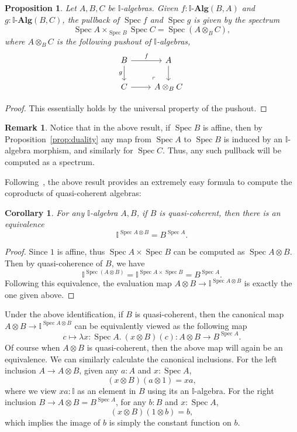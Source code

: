 \documentclass[12pt]{amsart}
\newtheorem{corollary}[theorem]{Corollary}
\newtheorem{proposition}[theorem]{Proposition}
\theoremstyle{definition}
\newtheorem{remark}[theorem]{Remark}
\newcommand{\mb}[1]{\mathbf{#1}}
\newcommand{\mbb}[1]{\mathbb{#1}}
\newcommand{\I}{\mbb I}
\newcommand{\alg}{\text{-}\mb{Alg}}
\newcommand{\ld}[2]{\lambda #1\!\colon\!\!#2.\ }
\newcommand{\spec}{\operatorname{Spec}}
\begin{document}
\begin{proposition}\label{prop:pullbackofaffine}
  Let $A,B,C$ be $\I$-algebras. Given $f : \I\alg(B,A)$ and $g : \I\alg(B,C)$, the pullback of $\spec f$ and $\spec g$ is given by the spectrum
  \[ \spec A \times_{\spec B} \spec C = \spec (A \otimes_B C), \]
  where $A \otimes_B C$ is the following pushout of $\I$-algebras,
  \[
    \begin{tikzcd}
      B \ar[r, "f"] \ar[d, "g"'] & A \ar[d] \\
      C \ar[r] & A \otimes_B C
      \arrow["\lrcorner"{anchor=center, pos=0.125, rotate=180}, draw=none, from=2-2, to=1-1]
    \end{tikzcd}
  \]
\end{proposition}
\begin{proof}
  This essentially holds by the universal property of the pushout.
\end{proof}

\begin{remark}
  Notice that in the above result, if $\spec B$ is affine, then by Proposition~\ref{prop:duality} any map from $\spec A$ to $\spec B$ is induced by an $\I$-algebra morphism, and similarly for $\spec C$. Thus, any such pullback will be computed as a spectrum.
\end{remark}

Following~\cite{Cherubini_Coquand_Hutzler_2024}, the above result provides an extremely easy formula to compute the coproducts of quasi-coherent algebras:

\begin{corollary}\label{cor:tensorasspace}
  For any $\I$-algebra $A,B$, if $B$ is quasi-coherent, then there is an equivalence
  \[ \I^{\spec A \otimes B} = B^{\spec A}. \]
\end{corollary}
\begin{proof}
  Since $1$ is affine, thus $\spec A \times \spec B$ can be computed as $\spec A \otimes B$. Then by quasi-coherence of $B$, we have
  \[ \I^{\spec(A \otimes B)} = \I^{\spec A \times \spec B} = B^{\spec A}. \]
  Following this equivalence, the evaluation map $A \otimes B \to \I^{\spec A \otimes B}$ is exactly the one given above.
\end{proof}

Under the above identification, if $B$ is quasi-coherent, then the canonical map $A \otimes B \to \I^{\spec A \otimes B}$ can be equivalently viewed as the following map 
\[ c \mapsto \ld{x}{\spec A} (x\otimes B)(c) : A \otimes B \to B^{\spec A}. \]
Of course when $A \otimes B$ is quasi-coherent, then the above map will again be an equivalence. We can similarly calculate the canonical inclusions. For the left inclusion $A \to A \otimes B$, given any $a : A$ and $x : \spec A$,
\[ (x \otimes B)(a \otimes 1) = xa, \]
where we view $xa : \I$ as an element in $B$ using its an $\I$-algebra. For the right inclusion $B \to A \otimes B = B^{\spec A}$, for any $b : B$ and $x : \spec A$,
\[ (x \otimes B)(1 \otimes b) = b, \]
which implies the image of $b$ is simply the constant function on $b$.
\end{document}
